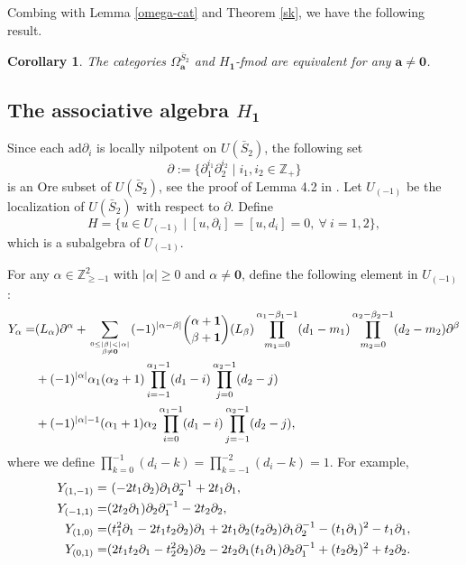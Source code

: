 \documentclass[12pt,a4paper]{amsart}
\newtheorem{Corollary}[Theorem]{Corollary}
\def\Z{\mathbb{Z}}
\def\m1{\mathbf{1}}
\def\p{\partial}
\def\a{\alpha}
\def\be{\beta}
\def\bS{\bar{S}_2}
\begin{document}
 Combing with Lemma \ref{omega-cat} and Theorem \ref{sk}, we have the following result.

\begin{Corollary}
The categories $\Omega^{\bar{S}_2}_{\mathbf{a}}$ and $H_{\m1}$-\emph{fmod} are equivalent for any $\mathbf{a}\neq \mathbf{0}$.
\end{Corollary}





\subsection{ The associative algebra $H_{\m1}$}
Since each $\text{ad}\p_i$ is locally nilpotent on $U(\bS)$, the following set
   $$\p:=\{\p_1^{i_1} \p_2^{i_2}\mid i_1, i_2\in\Z_{+}\}$$ is an Ore subset of $U(\bS)$, see the proof of Lemma 4.2 in \cite{M}.
Let  $U_{(-1)}$  be the localization of $U(\bS)$ with respect to $\p$.
Define $$H=\{u\in U_{(-1)}\mid [u,\p_i]=[u, d_i]=0,\ \forall\ i=1,2\}, $$
which is a subalgebra of $U_{(-1)} $.

For any $\a\in \Z_{\geq-1}^2$ with $|\a|\geq0$ and $\a\neq\mathbf{0}$,  define the following element in $U_{(-1)}$:
\begin{align*} \label{x-operator}
 Y_{\a}=&(L_\a)\p^{\a}
+\sum_{0\leq|\be|<|\a|\atop \be\neq \mathbf{0}}(-1)^{|\a-\be|}
\binom{\a+\mathbf{1}}{\be+\mathbf{1}}(L_\be)
\prod_{m_1=0}^{\a_1-\be_1-1}(d_1-m_1)
\prod_{m_2=0}^{\a_2-\be_2-1}(d_2-m_2)\p^{\be}\\
&+(-1)^{|\a|}\a_1(\a_2+1)\prod_{i=-1}^{\a_1-1}(d_1-i)
\prod_{j=0}^{\a_2-1}(d_2-j)\\
&+(-1)^{|\a|-1}(\a_1+1)\a_2\prod_{i=0}^{\a_1-1}(d_1-i)
\prod_{j=-1}^{\a_2-1}(d_2-j),\end{align*}
where we define $\prod_{k=0}^{-1}(d_i-k)
=\prod_{k=-1}^{-2}(d_i-k)=1$.
For example,
 \begin{equation}\label{x-w-def}
 \aligned  Y_{(1,-1)}= &\  (-2t_1\p_2)\p_1\p_2^{-1}+2t_1\p_1 ,\\
 Y_{(-1,1)}= &(2t_2\p_1)\p_2\p_1^{-1}-2t_2\p_2 ,\\
 Y_{(1,0)}=&(t_1^2\p_1-2t_1t_2\p_2)\p_1+2t_1\p_2(t_2\p_2)\p_1\p_2^{-1}-(t_1\p_1)^2-t_1\p_1, \\
 Y_{(0,1)}=&(2t_1t_2\p_1-t_2^2\p_2)\p_2-2t_2\p_1(t_1\p_1)\p_2\p_1^{-1}+(t_2\p_2)^2+t_2\p_2. \endaligned\end{equation}
\end{document}
